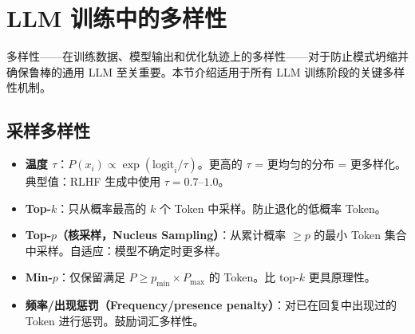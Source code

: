 \section{LLM 训练中的多样性}
\label{diversity-in-llm-training}

多样性——在训练数据、模型输出和优化轨迹上的多样性——对于防止模式坍缩并确保鲁棒的通用 LLM 至关重要。本节介绍适用于所有 LLM 训练阶段的关键多样性机制。

\subsection{采样多样性}
\label{sampling-diversity}

\begin{keybox}[用于多样化生成的采样策略]
\begin{itemize}
  \item \textbf{温度 $\tau$}：$P(x_i) \propto \exp(\text{logit}_i / \tau)$。更高的 $\tau$ = 更均匀的分布 = 更多样化。典型值：RLHF 生成中使用 $\tau=0.7$--$1.0$。
  \item \textbf{Top-$k$}：只从概率最高的 $k$ 个 Token 中采样。防止退化的低概率 Token。
  \item \textbf{Top-$p$（核采样，Nucleus Sampling）}：从累计概率 $\geq p$ 的最小 Token 集合中采样。自适应：模型不确定时更多样。
  \item \textbf{Min-$p$}：仅保留满足 $P \geq p_{\min} \times P_{\max}$ 的 Token。比 top-$k$ 更具原理性。
  \item \textbf{频率/出现惩罚（Frequency/presence penalty）}：对已在回复中出现过的 Token 进行惩罚。鼓励词汇多样性。
\end{itemize}
\end{keybox}

